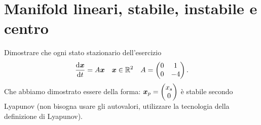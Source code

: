 \section{Manifold lineari, stabile, instabile e centro}%
\begin{ex}
    Dimostrare che ogni stato stazionario dell'esercizio
    \[
        \frac{\text{d} \boldsymbol{x}}{\text{d} t} = A \boldsymbol{x} \quad  \boldsymbol{x}\in \mathbb{R}^2 \quad
	A = 
    \begin{pmatrix}
	0  & 1 \\
	0 & -4 \\
    \end{pmatrix}
    .\] 
    Che abbiamo dimostrato essere della forma: $\boldsymbol{x}_p  = \begin{pmatrix} x_s \\ 0 \end{pmatrix} $ è stabile secondo Lyapunov (non bisogna usare gli autovalori, utilizzare la tecnologia della definizione di Lyapunov).
\end{ex}

